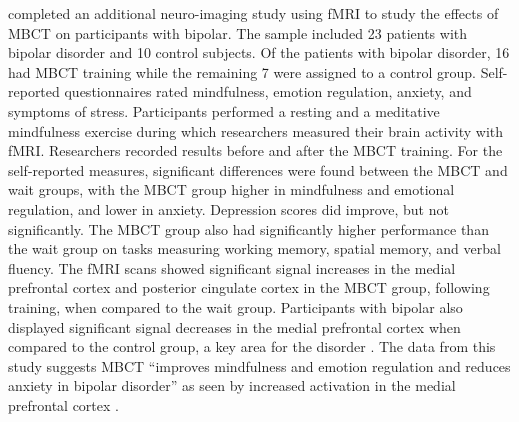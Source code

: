 \citet{ives-deliperi_effects_2013} completed an additional neuro-imaging study using fMRI to study the effects of MBCT on participants with bipolar. The sample included 23 patients with bipolar disorder and 10 control subjects. Of the patients with bipolar disorder, 16 had MBCT training while the remaining 7 were assigned to a control group. Self-reported questionnaires rated mindfulness, emotion regulation, anxiety, and symptoms of stress. Participants performed a resting and a meditative mindfulness exercise during which researchers measured their brain activity with fMRI. Researchers recorded results before and after the MBCT training.
For the self-reported measures, significant differences were found between the MBCT and wait groups, with the MBCT group higher in mindfulness and emotional regulation, and lower in anxiety. Depression scores did improve, but not significantly. The MBCT group also had significantly higher performance than the wait group on tasks measuring working memory, spatial memory, and verbal fluency. The fMRI scans showed significant signal increases in the medial prefrontal cortex and posterior cingulate cortex in the MBCT group, following training, when compared to the wait group. Participants with bipolar also displayed significant signal decreases in the medial prefrontal cortex when compared to the control group, a key area for the disorder \citep{anand_resting_2009}. The data from this study suggests MBCT “improves mindfulness and emotion regulation and reduces anxiety in bipolar disorder” as seen by increased activation in the medial prefrontal cortex \citep{ives-deliperi_effects_2013}.
  
  
  